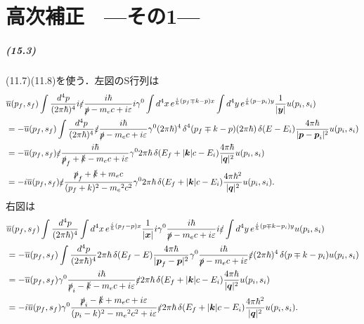 \setcounter{chapter}{14}

\chapter{高次補正　---その1---}
\paragraph{(15.3)}
(11.7)(11.8)を使う．左図のS行列は
\begin{align*}
  & \overline{u}(p_f, s_f) \int \frac{d^4p}{(2\pi\hbar)^4} i \slashed{\varepsilon} \frac{i\hbar}{\slashed{p} - m_ec + i\varepsilon} i\gamma^0 \int d^4x\, e^{\frac{i}{\hbar}(p_f \mp k - p)x} \int d^4y\, e^{\frac{i}{\hbar}(p - p_i)y} \frac{1}{\lvert\boldsymbol{y}\rvert} u(p_i, s_i) \\
  & = - \overline{u}(p_f, s_f) \int \frac{d^4p}{(2\pi\hbar)^4} \slashed{\varepsilon} \frac{i\hbar}{\slashed{p} - m_ec + i\varepsilon} \gamma^0 (2\pi\hbar)^4 \operatorname{\delta}^4(p_f \mp k - p) (2\pi\hbar) \operatorname{\delta}(E - E_i) \frac{4\pi\hbar}{\lvert\boldsymbol{p} - \boldsymbol{p}_i\rvert^2} u(p_i, s_i) \\
  & = - \overline{u}(p_f, s_f) \slashed{\varepsilon} \frac{i\hbar}{\slashed{p}_f + \slashed{k} - m_ec + i\varepsilon} \gamma^0 2\pi\hbar \operatorname{\delta}(E_f + \lvert\boldsymbol{k}\rvert c - E_i) \frac{4\pi\hbar}{\lvert\boldsymbol{q}\rvert^2} u(p_i, s_i) \\
  & = - i\overline{u}(p_f, s_f) \slashed{\varepsilon} \frac{\slashed{p}_f + \slashed{k} + m_ec}{(p_f + k)^2 - m_e{}^2c^2} \gamma^0 2\pi\hbar \operatorname{\delta}(E_f + \lvert\boldsymbol{k}\rvert c - E_i) \frac{4\pi\hbar^2}{\lvert\boldsymbol{q}\rvert^2} u(p_i, s_i).
\end{align*}
右図は
\begin{align*}
  & \overline{u}(p_f, s_f) \int \frac{d^4p}{(2\pi\hbar)^4} \int d^4x\, e^{\frac{i}{\hbar}(p_f - p)x} \frac{1}{\lvert\boldsymbol{x}\rvert} i \gamma^0 \frac{i\hbar}{\slashed{p} - m_ec + i\varepsilon} i\slashed{\varepsilon} \int d^4y\, e^{\frac{i}{\hbar}(p \mp k - p_i)y} u(p_i, s_i) \\
  & = -\overline{u}(p_f, s_f) \int \frac{d^4p}{(2\pi\hbar)^4} 2\pi\hbar \operatorname{\delta}(E_f - E) \frac{4\pi\hbar}{\lvert\boldsymbol{p}_f - \boldsymbol{p}\rvert^2} \gamma^0 \frac{i\hbar}{\slashed{p} - m_ec + i\varepsilon} \slashed{\varepsilon} (2\pi\hbar)^4 \operatorname{\delta}(p \mp k - p_i) u(p_i, s_i) \\
  & = - \overline{u}(p_f, s_f) \gamma^0 \frac{i\hbar}{\slashed{p}_i - \slashed{k} - m_ec + i\varepsilon} \slashed{\varepsilon} 2\pi\hbar \operatorname{\delta}(E_f + \lvert\boldsymbol{k}\rvert c - E_i) \frac{4\pi\hbar}{\lvert\boldsymbol{q}\rvert^2} u(p_i, s_i) \\
  & = - i\overline{u}(p_f, s_f) \gamma^0 \frac{\slashed{p}_i - \slashed{k} + m_ec + i\varepsilon}{(p_i - k)^2 - m_e{}^2c^2 + i\varepsilon} \slashed{\varepsilon} 2\pi\hbar \operatorname{\delta}(E_f + \lvert\boldsymbol{k}\rvert c - E_i) \frac{4\pi\hbar^2}{\lvert\boldsymbol{q}\rvert^2} u(p_i, s_i).
\end{align*}

